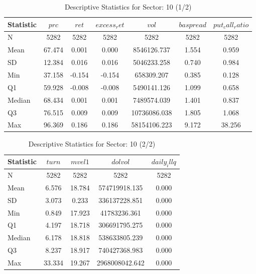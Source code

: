     \begin{table}[ht]
    \centering

    
    \caption{Descriptive Statistics for Sector: 10 (1/2)}
    \label{tab:sec10_a}
    
    \begin{tabular}{lcccccc}
    \toprule
    Statistic & $prc$ & $ret$ & $excess_ret$ & $vol$ & $baspread$ & $put_call_ratio$ \\\midrule
    N & 5282 & 5282 & 5282 & 5282 & 5282 & 5282 \\
    Mean & 67.474 & 0.001 & 0.000 & 8546126.737 & 1.554 & 0.959 \\
    SD & 12.384 & 0.016 & 0.016 & 5046233.258 & 0.740 & 0.984 \\
    Min & 37.158 & -0.154 & -0.154 & 658309.207 & 0.385 & 0.128 \\
    Q1 & 59.928 & -0.008 & -0.008 & 5490141.126 & 1.099 & 0.658 \\
    Median & 68.434 & 0.001 & 0.001 & 7489574.039 & 1.401 & 0.837 \\
    Q3 & 76.515 & 0.009 & 0.009 & 10736086.038 & 1.805 & 1.068 \\
    Max & 96.369 & 0.186 & 0.186 & 58154106.223 & 9.172 & 38.256 \\
    \bottomrule
    \end{tabular}

    \end{table}
    
    \begin{table}[ht]
    \centering

    
    \caption{Descriptive Statistics for Sector: 10 (2/2)}
    \label{tab:sec10_b}
    
    \begin{tabular}{lcccc}
    \toprule
    Statistic & $turn$ & $mvel1$ & $dolvol$ & $daily_illq$ \\\midrule
    N & 5282 & 5282 & 5282 & 5282 \\
    Mean & 6.576 & 18.784 & 574719918.135 & 0.000 \\
    SD & 3.073 & 0.233 & 336137228.851 & 0.000 \\
    Min & 0.849 & 17.923 & 41783236.361 & 0.000 \\
    Q1 & 4.197 & 18.718 & 306691795.275 & 0.000 \\
    Median & 6.178 & 18.818 & 538633805.239 & 0.000 \\
    Q3 & 8.237 & 18.917 & 740427368.983 & 0.000 \\
    Max & 33.334 & 19.267 & 2968008042.642 & 0.000 \\
    \bottomrule
    \end{tabular}

    \end{table}
    
